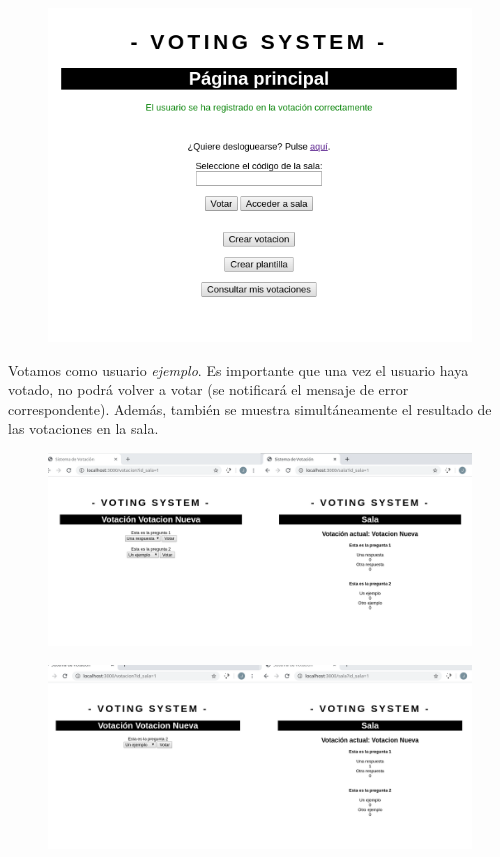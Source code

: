 \documentclass{article}
\begin{document}
 	\begin{figure}[H]
 		\centering
 		\includegraphics[totalheight=7.6cm]{img/cap12}
 		\caption{}
 	\end{figure}
 	\newpage
 
	 Votamos como usuario \textit{ejemplo}. Es importante que una vez el usuario haya votado, no podrá volver a votar (se notificará el mensaje de error correspondente).
	 Además, también se muestra simultáneamente el resultado de las votaciones en la sala. \\
 
 	\begin{figure}[H]
 		\centering
 		\includegraphics[totalheight=6.5cm]{img/cap13}
 		\caption{}
 	\end{figure}
 
 	\begin{figure}[H]
 		\centering
 		\includegraphics[totalheight=6.5cm]{img/cap14}
 		\caption{}
 	\end{figure}
 
\end{document}
